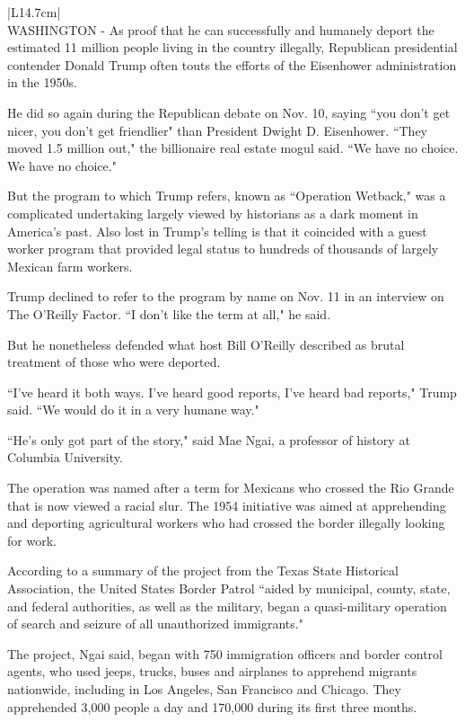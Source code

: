 \begin{table}
\begin{center}
\begin{tabular}{|L{14.7cm}|}\hline
{} \\ \hline
\tiny WASHINGTON - As proof that he can successfully and humanely deport the estimated 11 million people living in the country illegally, Republican presidential contender Donald Trump often touts the efforts of the Eisenhower administration in the 1950s.

He did so again during the Republican debate on Nov. 10, saying ``you don't get nicer, you don't get friendlier" than President Dwight D. Eisenhower. ``They moved 1.5 million out," the billionaire real estate mogul said. ``We have no choice. We have no choice."

But the program to which Trump refers, known as ``Operation Wetback," was a complicated undertaking largely viewed by historians as a dark moment in America's past. Also lost in Trump's telling is that it coincided with a guest worker program that provided legal status to hundreds of thousands of largely Mexican farm workers.

Trump declined to refer to the program by name on Nov. 11 in an interview on The O'Reilly Factor. ``I don't like the term at all," he said.

But he nonetheless defended what host Bill O'Reilly described as brutal treatment of those who were deported.

``I've heard it both ways. I've heard good reports, I've heard bad reports," Trump said. ``We would do it in a very humane way."

``He's only got part of the story," said Mae Ngai, a professor of history at Columbia University.

The operation was named after a term for Mexicans who crossed the Rio Grande that is now viewed a racial slur. The 1954 initiative was aimed at apprehending and deporting agricultural workers who had crossed the border illegally looking for work.

According to a summary of the project from the Texas State Historical Association, the United States Border Patrol ``aided by municipal, county, state, and federal authorities, as well as the military, began a quasi-military operation of search and seizure of all unauthorized immigrants."

The project, Ngai said, began with 750 immigration officers and border control agents, who used jeeps, trucks, buses and airplanes to apprehend migrants nationwide, including in Los Angeles, San Francisco and Chicago. They apprehended 3,000 people a day and 170,000 during its first three months.


\end{tabular}
\end{center}
\end{table}
